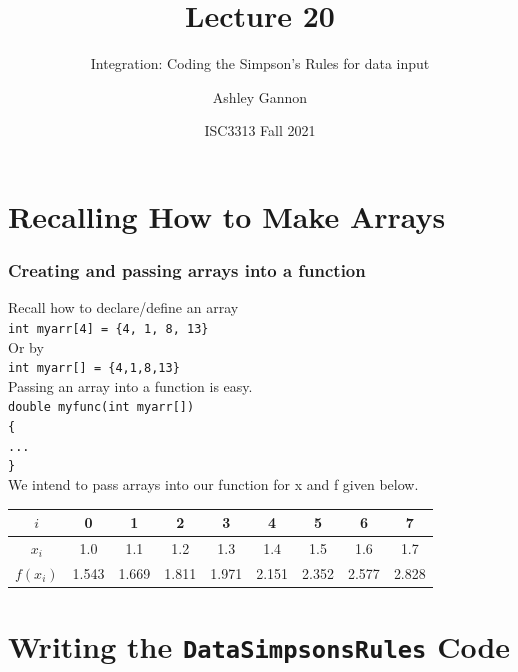 \documentclass{if-beamer}
\title[Lecture 20]{Lecture 20}
\subtitle{Integration: Coding the Simpson's Rules for data input}
\author{Ashley Gannon}
\date{ISC3313 Fall 2021}
\begin{document}
\begin{frame}
  \titlepage
\end{frame}
\section{Recalling How to Make Arrays}

\begin{frame}
\frametitle{Creating and passing arrays into a function}
Recall how to declare/define an array\\\vspace{5pt}
\texttt{int myarr[4] = \{4, 1, 8, 13\}}\\\vspace{5pt}
Or by \\\vspace{5pt}
\texttt{int myarr[] = \{4,1,8,13\}}\\\vspace{5pt}
Passing an array into a function is easy. \vspace{5pt}
\\\texttt{double myfunc(int myarr[])}
\\\texttt{\{}
\\\texttt{\qquad ...}
\\\texttt{\}}	\\
We intend to pass arrays into our function for x and f given below.
\begin{table}
	\begin{tabular}{c| c c c c c c c c}
		$i$ &0& 1&2&3&4&5&6&7 \\
		\hline
		$x_i$& 1.0 &1.1&1.2&1.3&1.4&1.5&1.6&1.7\\
		$f(x_i)$&1.543&1.669&1.811&1.971&2.151&2.352&2.577&2.828\\		
	\end{tabular}
\end{table}

\end{frame}

\section{Writing the \texttt{DataSimpsonsRules} Code}
\end{document}
